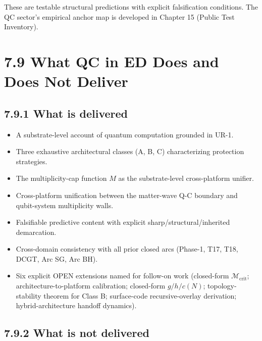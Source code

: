 \documentclass[11pt]{book}
\begin{document}
These are testable structural predictions with explicit falsification conditions. The QC sector's empirical anchor map is developed in Chapter 15 (Public Test Inventory).

\section{7.9 What QC in ED Does and Does Not Deliver}

\subsection{7.9.1 What is delivered}

\begin{itemize}
\item A substrate-level account of quantum computation grounded in UR-1.
\item Three exhaustive architectural classes (A, B, C) characterizing protection strategies.
\item The multiplicity-cap function $M$ as the substrate-level cross-platform unifier.
\item Cross-platform unification between the matter-wave Q-C boundary and qubit-system multiplicity walls.
\item Falsifiable predictive content with explicit sharp/structural/inherited demarcation.
\item Cross-domain consistency with all prior closed arcs (Phase-1, T17, T18, DCGT, Arc SG, Arc BH).
\item Six explicit OPEN extensions named for follow-on work (closed-form $\mathcal{M}_\mathrm{crit}$; architecture-to-platform calibration; closed-form $g/h/c(N)$; topology-stability theorem for Class B; surface-code recursive-overlay derivation; hybrid-architecture handoff dynamics).
\end{itemize}

\subsection{7.9.2 What is not delivered}
\end{document}
